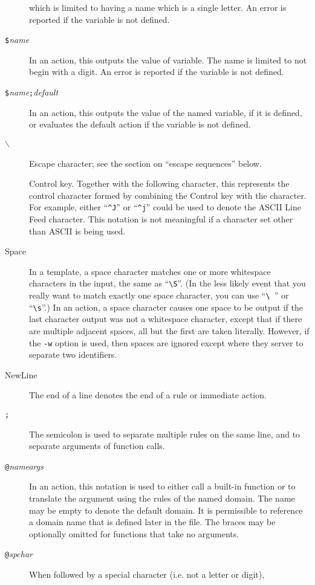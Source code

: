 \begin{description}
which is limited to having a name which is a single letter.
An error is reported if the variable is not defined.
\item[{\tt \$\ttlb }{\it name}{\tt \ttrb }]
In an action, this outputs the value of variable.  The name is limited
to not begin with a digit.  An error is reported if the variable is not
defined.
\item[{\tt \$\ttlb }{\it name}{\tt ;}{\it default}{\tt \ttrb }]
In an action, this outputs the value of the named variable, if it is
defined, or evaluates the default action if the variable is not defined.
\item[{\tt $\backslash$ }]
Escape character; see the section on ``escape sequences'' below.
\item[\tt \ttcaret]
Control key.  Together with the following character, this represents the
control character formed by combining the Control key with the character.
For example, either ``\verb/^J/'' or ``\verb/^j/'' could be used to
denote the ASCII Line Feed character.  This notation is not meaningful if a
character set other than ASCII is being used.
\item[Space]
In a template, a space character matches one or more whitespace
characters in the input, the same as ``\verb|\S|''.
(In the less likely event that you really want to
match exactly one space character, you can use ``\verb/\ /'' or
``\verb/\s/''.) 
In an action, a space character causes one space to be output if the
last character output was not a whitespace character, except that if
there are multiple adjacent spaces, all but the first are taken literally.
However, if the \verb/-w/ option is used, then spaces are ignored except
where they server to separate two identifiers.
\item[NewLine]
The end of a line denotes the end of a rule or immediate action.
\item[{\tt ;}]
The semicolon is used to separate multiple rules on the same line, and
to separate arguments of function calls.
\item[{\tt @}{\it name}{\tt \ttlb }{\it args}{\tt \ttrb }]
In an action, this notation is used to either call a built-in function
or to translate the argument using the rules of the named domain.
The name may be empty to denote the default domain.
It is permissible to reference a domain name that is defined later in the
file. 
The braces may be optionally omitted for functions that take no arguments.
\item[{\tt @}{\it spchar}]
When followed by a special character (i.e. not a letter or digit),

\end{description}
